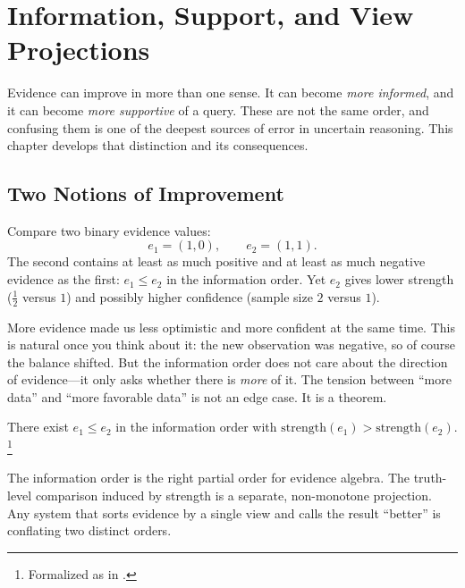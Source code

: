 \documentclass[11pt,openany]{report}
\begin{document}

\chapter{Information, Support, and View Projections}
\label{ch:views}

Evidence can improve in more than one sense.  It can become
\emph{more informed}, and it can become \emph{more supportive} of a
query.  These are not the same order, and confusing them is one of
the deepest sources of error in uncertain reasoning.  This chapter
develops that distinction and its consequences.

\section{Two Notions of Improvement}

Compare two binary evidence values:
\[
  e_1 = (1, 0), \qquad e_2 = (1, 1).
\]
The second contains at least as much positive and at least as much
negative evidence as the first: $e_1 \le e_2$ in the information
order.  Yet $e_2$ gives lower strength ($\tfrac{1}{2}$ versus $1$)
and possibly higher confidence (sample size $2$ versus $1$).

More evidence made us less optimistic and more confident at the same
time.  This is natural once you think about it: the new observation
was negative, so of course the balance shifted.  But the information
order does not care about the direction of evidence---it only asks
whether there is \emph{more} of it.  The tension between ``more
data'' and ``more favorable data'' is not an edge case.  It is a
theorem.

\begin{theorem}
\label{thm:strength-not-monotone}
There exist $e_1 \le e_2$ in the information order with
$\mathrm{strength}(e_1) > \mathrm{strength}(e_2)$.%
\footnote{Formalized as 
in .}
\end{theorem}

\noindent
The information order is the right partial order for evidence algebra.
The truth-level comparison induced by strength is a separate,
non-monotone projection.  Any system that sorts evidence by a single
view and calls the result ``better'' is conflating two distinct orders.
\end{document}
